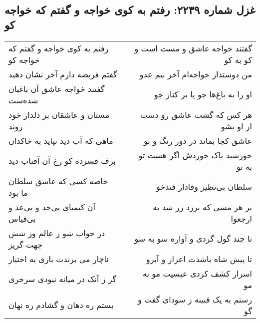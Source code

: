 \begin{center}
\section*{غزل شماره ۲۲۳۹: رفتم به کوی خواجه و گفتم که خواجه کو}
\label{sec:2239}
\begin{longtable}{l p{0.5cm} r}
رفتم به کوی خواجه و گفتم که خواجه کو
&&
گفتند خواجه عاشق و مست است و کو به کو
\\
گفتم فریضه دارم آخر نشان دهید
&&
من دوستدار خواجه‌ام آخر نیم عدو
\\
گفتند خواجه عاشق آن باغبان شده‌ست
&&
او را به باغ‌ها جو یا بر کنار جو
\\
مستان و عاشقان بر دلدار خود روند
&&
هر کس که گشت عاشق رو دست از او بشو
\\
ماهی که آب دید نپاید به خاکدان
&&
عاشق کجا بماند در دور رنگ و بو
\\
برف فسرده کو رخ آن آفتاب دید
&&
خورشید پاک خوردش اگر هست تو به تو
\\
خاصه کسی که عاشق سلطان ما بود
&&
سلطان بی‌نظیر وفادار قندخو
\\
آن کیمیای بی‌حد و بی‌عد و بی‌قیاس
&&
بر هر مسی که برزد زر شد به ارجعوا
\\
در خواب شو ز عالم وز شش جهت گریز
&&
تا چند گول گردی و آواره سو به سو
\\
ناچار می برندت باری به اختیار
&&
تا پیش شاه باشدت اعزاز و آبرو
\\
گر ز آنک در میانه نبودی سرخری
&&
اسرار کشف کردی عیسیت مو به مو
\\
بستم ره دهان و گشادم ره نهان
&&
رستم به یک قنینه ز سودای گفت و گو
\\
\end{longtable}
\end{center}
